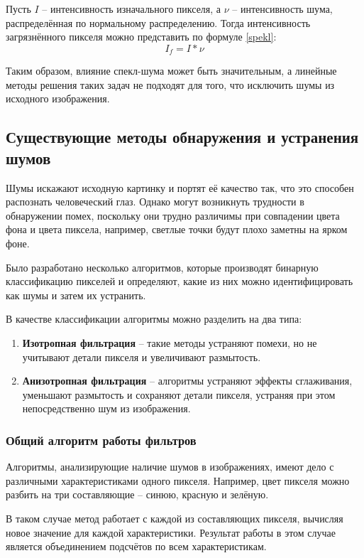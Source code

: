Пусть $I$ -- интенсивность изначального пикселя, а $\nu$ -- интенсивность шума, распределённая по нормальному распределению. 
Тогда интенсивность загрязнённого пикселя можно представить по формуле \ref{spekl}: 
\begin{equation}
	\label{spekl}
	I_f = I * \nu
\end{equation}

Таким образом, влияние спекл-шума может быть значительным, а линейные методы решения таких задач не подходят для того, что исключить шумы из исходного изображения.

\subsection{Существующие методы обнаружения и устранения шумов}
Шумы искажают исходную картинку и портят её качество так, что это способен распознать человеческий глаз.
Однако могут возникнуть трудности в обнаружении помех, поскольку они трудно различимы при совпадении цвета фона и цвета пиксела, например, светлые точки будут плохо заметны на ярком фоне.

Было разработано несколько алгоритмов, которые производят бинарную классификацию пикселей и определяют, какие из них можно идентифицировать как шумы и затем их устранить.

В качестве классификации алгоритмы можно разделить на два типа:
\begin{enumerate}
	\item \textbf{Изотропная фильтрация} -- такие методы устраняют помехи, но не учитывают детали пикселя и увеличивают размытость.
	\item \textbf{Анизотропная фильтрация} -- алгоритмы устраняют эффекты сглаживания, уменьшают размытость и сохраняют детали пикселя, устраняя при этом непосредственно шум из изображения.
\end{enumerate}


\subsubsection{Общий алгоритм работы фильтров}
Алгоритмы, анализирующие наличие шумов в изображениях, имеют дело с различными характеристиками одного пикселя.
Например, цвет пикселя можно разбить на три составляющие -- синюю, красную и зелёную. 

В таком случае метод работает с каждой из составляющих пикселя, вычисляя новое значение для каждой характеристики.
Результат работы в этом случае является объединением подсчётов по всем характеристикам.

